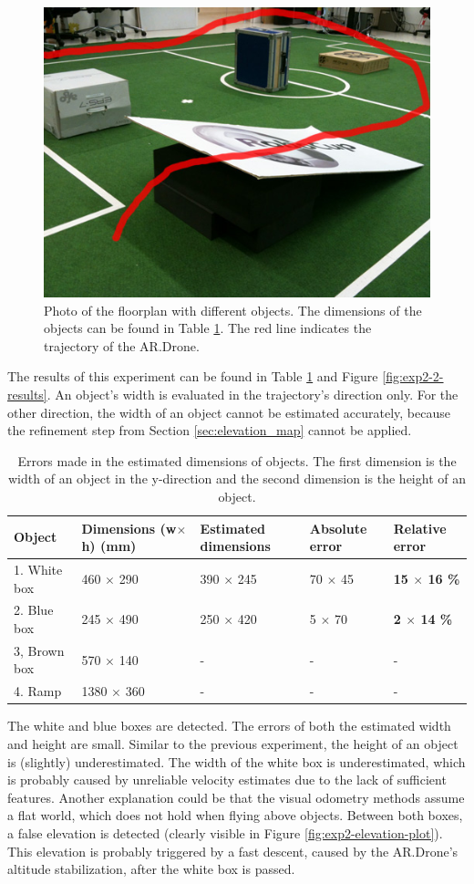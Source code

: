 \begin{figure}[htb!]
\centering
\includegraphics[width=0.4\linewidth]{images/exp2-elevation-setup.jpg}
\caption{Photo of the floorplan with different objects. The dimensions of the objects can be found in Table \ref{tab:exp2}. The red line indicates the trajectory of the AR.Drone.}
\label{fig:exp2-setup}
\end{figure}

The results of this experiment can be found in Table \ref{tab:exp2} and Figure \ref{fig:exp2-2-results}.
An object's width is evaluated in the trajectory's direction only. 
For the other direction, the width of an object cannot be estimated accurately, because the refinement step from Section \ref{sec:elevation_map} cannot be applied.


\begin{table}[htb!]
    \centering
    \begin{tabular}
        { | l | l | l | l | l | } 
	\hline
	Object & Dimensions (w$\times$h) (\small{mm}) & Estimated dimensions & Absolute error & Relative error \\
        \hline
        1. White box	& 460 $\times$ 290	& 390 $\times$ 245	& 70 $\times$ 45	& \textbf{15 $\times$ 16 \%}\\
	2. Blue box	& 245 $\times$ 490	& 250 $\times$ 420	& 5 $\times$ 70	& \textbf{2 $\times$ 14 \%}\\
	3, Brown box	& 570 $\times$ 140	& - 					& - 				& - \\
	4. Ramp		& 1380 $\times$ 360	& - 					& - 				& - \\
	\hline
    \end{tabular}
    \caption{Errors made in the estimated dimensions of objects. The first dimension is the width of an object in the y-direction and the second dimension is the height of an object. }
    \label{tab:exp2}
\end{table}

The white and blue boxes are detected.
The errors of both the estimated width and height are small.
Similar to the previous experiment, the height of an object is (slightly) underestimated.
The width of the white box is underestimated, which is probably caused by unreliable velocity estimates due to the lack of sufficient features.
Another explanation could be that the visual odometry methods assume a flat world, which does not hold when flying above objects.
Between both boxes, a false elevation is detected (clearly visible in Figure \ref{fig:exp2-elevation-plot}).
This elevation is probably triggered by a fast descent, caused by the AR.Drone's altitude stabilization, after the white box is passed.


